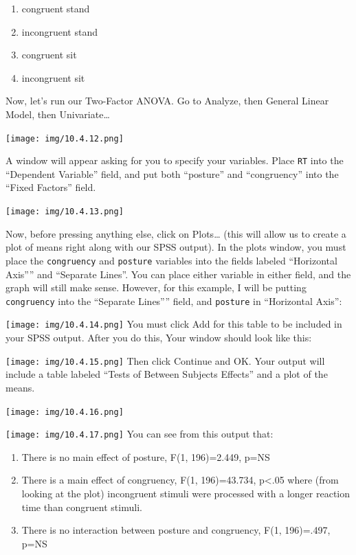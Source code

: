 \documentclass[
]{book}
\providecommand{\tightlist}{%
  \setlength{\itemsep}{0pt}\setlength{\parskip}{0pt}}
\begin{document}
\begin{enumerate}
\def\labelenumi{\arabic{enumi}.}
\tightlist
\item
  congruent stand
\item
  incongruent stand
\item
  congruent sit
\item
  incongruent sit
\end{enumerate}

Now, let's run our Two-Factor ANOVA. Go to {Analyze}, then {General Linear Model}, then {Univariate\ldots{}}

\texttt{[image: img/10.4.12.png]}

A window will appear asking for you to specify your variables. Place \texttt{RT} into the ``Dependent Variable'' field, and put both ``posture'' and ``congruency'' into the ``Fixed Factors'' field.

\texttt{[image: img/10.4.13.png]}

Now, before pressing anything else, click on {Plots\ldots{}} (this will allow us to create a plot of means right along with our SPSS output). In the plots window, you must place the \texttt{congruency} and \texttt{posture} variables into the fields labeled ``Horizontal Axis'''' and ``Separate Lines''. You can place either variable in either field, and the graph will still make sense. However, for this example, I will be putting \texttt{congruency} into the ``Separate Lines'''' field, and \texttt{posture} in ``Horizontal Axis'':

\texttt{[image: img/10.4.14.png]}
You must click {Add} for this table to be included in your SPSS output. After you do this, Your window should look like this:

\texttt{[image: img/10.4.15.png]}
Then click {Continue} and {OK}. Your output will include a table labeled ``Tests of Between Subjects Effects'' and a plot of the means.

\texttt{[image: img/10.4.16.png]}

\texttt{[image: img/10.4.17.png]}
You can see from this output that:

\begin{enumerate}
\def\labelenumi{\arabic{enumi}.}
\tightlist
\item
  There is no main effect of posture, F(1, 196)=2.449, p=NS
\item
  There is a main effect of congruency, F(1, 196)=43.734, p\textless.05 where (from looking at the plot) incongruent stimuli were processed with a longer reaction time than congruent stimuli.
\item
  There is no interaction between posture and congruency, F(1, 196)=.497, p=NS
\end{enumerate}
\end{document}
